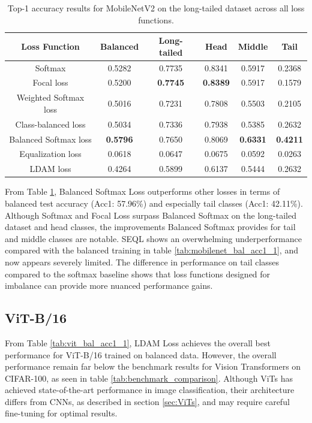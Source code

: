 \begin{table}[h!]
    \centering
    \caption{Top-1 accuracy results for MobileNetV2 on the long-tailed dataset across all loss functions.}
    \begin{tabular}{cccccc}
        \toprule
        Loss Function & Balanced & Long-tailed & Head & Middle & Tail \\ 
        \midrule
        Softmax   & 0.5282   & 0.7735 & 0.8341 & 0.5917 & 0.2368 \\
        Focal loss   & 0.5200   & \textbf{0.7745} & \textbf{0.8389} & 0.5917 & 0.1579 \\
        Weighted Softmax loss   & 0.5016   & 0.7231 & 0.7808 & 0.5503 & 0.2105 \\
        Class-balanced loss   &  0.5034  & 0.7336 & 0.7938 & 0.5385 & 0.2632 \\
        Balanced Softmax loss   & \textbf{0.5796}   & 0.7650 & 0.8069 & \textbf{0.6331} & \textbf{0.4211} \\
        Equalization loss   &   0.0618 & 0.0647 & 0.0675 & 0.0592 & 0.0263 \\
        LDAM loss   & 0.4264 & 0.5899 & 0.6137 & 0.5444 & 0.2632 \\
        \bottomrule
    \end{tabular}
    \label{tab:mobilenet_lt_acc1_1}
\end{table}

From Table \ref{tab:mobilenet_lt_acc1_1}, Balanced Softmax Loss outperforms other losses in terms of balanced test accuracy (Acc1: 57.96\%) and especially tail classes (Acc1: 42.11\%). Although Softmax and Focal Loss surpass Balanced Softmax on the long-tailed dataset and head classes, the improvements Balanced Softmax provides for tail and middle classes are notable. SEQL shows an overwhelming underperformance compared with the balanced training in table \ref{tab:mobilenet_bal_acc1_1}, and now appears severely limited. The difference in performance on tail classes compared to the softmax baseline shows that loss functions designed for imbalance can provide more nuanced performance gains.


\subsection{ViT-B/16}

From Table \ref{tab:vit_bal_acc1_1}, LDAM Loss achieves the overall best performance for ViT-B/16 trained on balanced data. However, the overall performance remain far below the benchmark results for Vision Transformers on CIFAR-100, as seen in table \ref{tab:benchmark_comparison}. Although ViTs has achieved state-of-the-art performance in image classification, their architecture differs from CNNs, as described in section \ref{sec:ViTs}, and may require careful fine-tuning for optimal results. 

